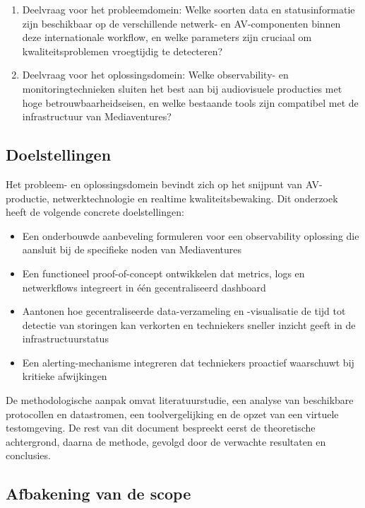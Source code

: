 \begin{enumerate}
\item Deelvraag voor het probleemdomein: Welke soorten data en statusinformatie zijn beschikbaar op de verschillende netwerk- en AV-com\-po\-nen\-ten binnen deze internationale workflow, en welke parameters zijn cruciaal om kwaliteitsproblemen vroegtijdig te detecteren?

\item Deelvraag voor het oplossingsdomein: Welke observability- en monitoringtechnieken sluiten het best aan bij audiovisuele producties met hoge betrouwbaarheidseisen, en welke bestaande tools zijn compatibel met de infrastructuur van Mediaventures?

\end{enumerate}

\subsection{Doelstellingen}

Het probleem- en oplossingsdomein bevindt zich op het snijpunt van AV-productie, netwerktechnologie en realtime kwaliteitsbewaking. Dit onderzoek heeft de volgende concrete doelstellingen:

\begin{itemize}
\item Een onderbouwde aanbeveling formuleren voor een observability oplossing die aansluit bij de specifieke noden van Mediaventures
\item Een functioneel proof-of-concept ontwikkelen dat metrics, logs en netwerk\-flows integreert in één gecentraliseerd dashboard
\item Aantonen hoe gecentraliseerde data-verzameling en -visualisatie de tijd tot detectie van storingen kan verkorten en techniekers sneller inzicht geeft in de infrastructuur\-status
\item Een alerting-mechanisme integreren dat techniekers proactief waarschuwt bij kritieke afwijkingen
\end{itemize}

De methodologische aanpak omvat literatuurstudie, een analyse van beschikbare protocollen en datastromen, een toolvergelijking en de opzet van een virtuele testomgeving. De rest van dit document bespreekt eerst de theoretische achtergrond, daarna de methode, gevolgd door de verwachte resultaten en conclusies.

\subsection{Afbakening van de scope}

